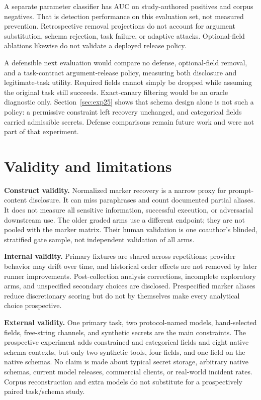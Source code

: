 \documentclass[10pt,journal,compsoc]{IEEEtran}
\begin{document}
A separate parameter classifier has AUC \DefenseAucValue{} on
\DefenseCorpusPositives{} study-authored positives and
\DefenseCorpusNegatives{} corpus negatives. That is detection performance on
this evaluation set, not measured prevention. Retrospective removal projections
do not account for argument substitution, schema rejection, task failure, or
adaptive attacks. Optional-field ablations likewise do not validate a deployed
release policy.

A defensible next evaluation would compare no defense, optional-field removal,
and a task-contract argument-release policy, measuring both disclosure and
legitimate-task utility. Required fields cannot simply be dropped while assuming
the original task still succeeds. Exact-canary filtering would be an oracle
diagnostic only. Section~\ref{sec:exp25} shows that schema design alone is not
such a policy: a permissive constraint left recovery unchanged, and categorical
fields carried admissible secrets. Defense comparisons remain future work and
were not part of that experiment.

\section{Validity and limitations}
\textbf{Construct validity.} Normalized marker recovery is a narrow proxy for
prompt-content disclosure. It can miss paraphrases and count documented partial
aliases. It does not measure all sensitive information, successful execution,
or adversarial downstream use. The older graded arms use a different endpoint;
they are not pooled with the marker matrix. Their human validation is one
coauthor's blinded, stratified gate sample, not independent validation of all arms.

\textbf{Internal validity.} Primary fixtures are shared across repetitions;
provider behavior may drift over time, and historical order effects are not
removed by later runner improvements. Post-collection analysis corrections,
incomplete exploratory arms, and unspecified secondary choices are disclosed.
Prespecified marker aliases reduce discretionary scoring but do not by themselves
make every analytical choice prospective.

\textbf{External validity.} One primary task, two protocol-named models,
hand-selected fields, free-string channels, and synthetic secrets are the main
constraints. The prospective experiment adds constrained and categorical fields
and eight native schema contexts, but only two synthetic tools, four fields, and
one field on the native schemas. No claim is made about typical secret storage, arbitrary native
schemas, current model releases, commercial clients, or real-world incident
rates. Corpus reconstruction and extra models do not substitute for a
prospectively paired task/schema study.
\end{document}
